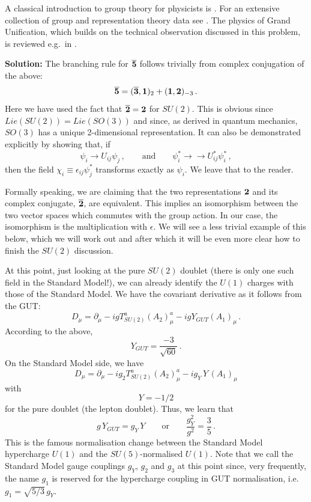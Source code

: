 \documentclass[12pt]{article}
\newcommand{\be}{\begin{equation}}
\newcommand{\ee}{\end{equation}}
\newcommand{\ol}{\overline}
\numberwithin{equation}{section}
\begin{document}
A classical introduction to group theory for physicists is \cite{Georgi:1999wka}. For an extensive collection of group and representation theory data see \cite{Slansky:1981yr}. The physics of Grand Unification, which builds on the technical observation discussed in this problem, is reviewed e.g.~in \cite{Ross:1985ai, Nath:2006ut, Raby:2017ucc, hh, Croon:2019kpe}.

\noindent
{\bf Solution:} The branching rule for $\ol{\bf 5}$ follows trivially from complex conjugation of the above:
\be
\ol{\bf 5}=(\ol{\bf 3},{\bf 1})_2+({\bf 1},{\bf 2})_{-3}\,.
\ee
Here we have used the fact that $\ol{\bf 2}={\bf 2}$ for $SU(2)$. This is obvious since $Lie(SU(2))=Lie(SO(3))$ and since, as derived in quantum mechanics, $SO(3)$ has a unique 2-dimensional representation. It can also be demonstrated explicitly by showing that, if 
\be
\psi_i\to U_{ij}\psi_j\,,\qquad\mbox{and}\qquad \psi_i^*\to \to U^*_{ij} \psi_i^*\,,
\ee
then the field $\chi_i\equiv \epsilon_{ij}\psi^*_j$ transforms exactly as $\psi_i$. We leave that to the reader. 

Formally speaking, we are claiming that the two representations ${\bf 2}$ and its complex conjugate, $\ol{\bf 2}$, are equivalent. This implies an isomorphism between the two vector spaces which commutes with the group action. In our case, the isomorphism is the multiplication with $\epsilon$. We will see a less trivial example of this below, which we will work out and after which it will be even more clear how to finish the $SU(2)$ discussion.

At this point, just looking at the pure $SU(2)$ doublet (there is only one such field in the Standard Model!), we can already identify the $U(1)$ charges with those of the Standard Model. We have the covariant derivative as it follows from the GUT:
\be
D_\mu=\partial_\mu-igT^a_{SU(2)}(A_2)_\mu^a-igY_{GUT}(A_1)_\mu\,.
\ee
According to the above,
\be
Y_{GUT}=\frac{-3}{\sqrt{60}}\,.\label{ygut}
\ee
On the Standard Model side, we have
\be
D_\mu=\partial_\mu-ig_2T^a_{SU(2)}(A_2)_\mu^a-ig_Y\,Y\,(A_1)_\mu
\ee
with
\be
Y=-1/2\label{ysm}
\ee
for the pure doublet (the lepton doublet).  Thus, we learn that 
\be
g\,Y_{GUT}=g_Y\,Y \qquad \mbox{or}\qquad \frac{g_Y^2}{g^2}=\frac{3}{5}\,.
\ee
This is the famous normalisation change between the Standard Model hypercharge $U(1)$ and the $SU(5)$-normalised $U(1)$. Note that we call the Standard Model gauge couplings $g_Y$, $g_2$ and $g_3$ at this point since, very frequently, the name $g_1$ is reserved for the hypercharge coupling in GUT normalisation, i.e. $g_1=\sqrt{5/3}\,g_Y$. 
\end{document}
